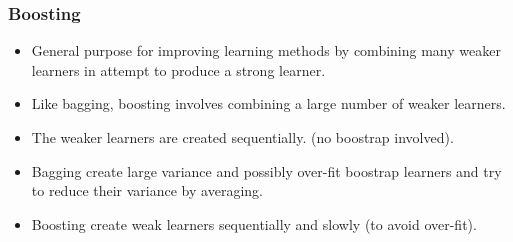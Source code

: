 \documentclass{beamer}
\begin{document}
                          
                     
                     \begin{frame}
                     	\frametitle{Boosting}
                     	\begin{itemize}
                     		\item General purpose for improving learning methods by combining many weaker learners in attempt to produce a strong learner.
                     		\item Like bagging, boosting involves combining
                     		a large number of weaker learners.
                     		\item The weaker learners are created sequentially. (no boostrap involved).
                     		\item   Bagging create   large variance and possibly 
                     		over-fit boostrap learners  and try to reduce their variance by averaging.
                     		\item  Boosting create weak learners sequentially and slowly (to avoid over-fit).
                     
                     	\end{itemize}
                     \end{frame} 
\end{document}
